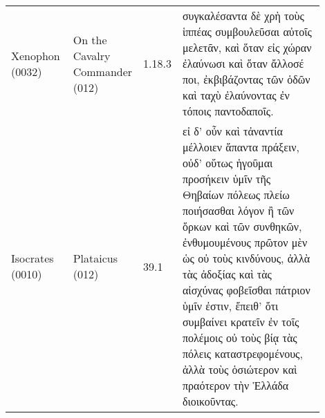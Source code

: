 {\begin{longtable}{p{0.2\linewidth}p{0.2\linewidth}lp{0.5\linewidth}}
Xenophon (0032) & On the Cavalry Commander (012) & 1.18.3 & συγκαλέσαντα δὲ χρὴ τοὺς ἱππέας συμβουλεῦσαι αὐτοῖς μελετᾶν, καὶ ὅταν εἰς χώραν ἐλαύνωσι καὶ ὅταν ἄλλοσέ ποι, ἐκβιβάζοντας τῶν ὁδῶν καὶ ταχὺ ἐλαύνοντας ἐν τόποις παντοδαποῖς.\\
\addlinespace
Isocrates (0010) & Plataicus (012) & 39.1 & εἰ δ’ οὖν καὶ τἀναντία μέλλοιεν ἅπαντα πράξειν, οὐδ’ οὕτως ἡγοῦμαι προσήκειν ὑμῖν τῆς Θηβαίων πόλεως πλείω ποιήσασθαι λόγον ἢ τῶν ὅρκων καὶ τῶν συνθηκῶν, ἐνθυμουμένους πρῶτον μὲν ὡς οὐ τοὺς κινδύνους, ἀλλὰ τὰς ἀδοξίας καὶ τὰς αἰσχύνας φοβεῖσθαι πάτριον ὑμῖν ἐστιν, ἔπειθ’ ὅτι συμβαίνει κρατεῖν ἐν τοῖς πολέμοις οὐ τοὺς βίᾳ τὰς πόλεις καταστρεφομένους, ἀλλὰ τοὺς ὁσιώτερον καὶ πραότερον τὴν Ἑλλάδα διοικοῦντας.\\
\bottomrule
\end{longtable}
}
